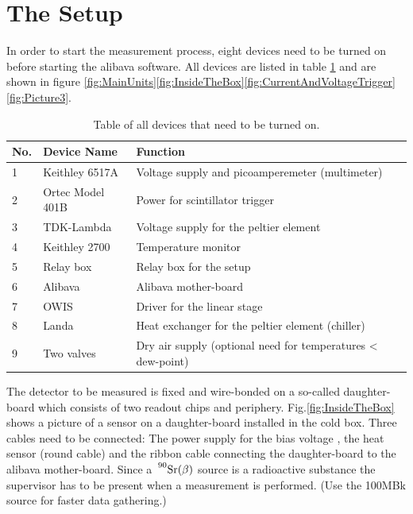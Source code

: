 \documentclass{article}
\begin{document}
\section{The Setup}
In order to start the measurement process, eight devices need to be turned on before starting the alibava software. All devices are listed in table \ref{tab:devices} and are shown in figure \ref{fig:MainUnits}\ref{fig:InsideTheBox}\ref{fig:CurrentAndVoltageTrigger}\ref{fig:Picture3}.
\begin{table}[htb]
\begin{center}
    \begin{tabular}{|l|l|l|}
        \hline
    No. & Device Name        & Function    \\  \hline
        1 & Keithley 6517A        & Voltage supply and picoamperemeter (multimeter)         \\
        2 & Ortec Model 401B        & Power for scintillator trigger        \\
        3 & TDK-Lambda            & Voltage supply for the peltier element         \\
        4 & Keithley 2700        & Temperature monitor          \\
        5 & Relay box            & Relay box for the setup         \\
        6 & Alibava            & Alibava mother-board         \\
        7 & OWIS            & Driver for the linear stage         \\
        8 & Landa            & Heat exchanger for the peltier element (chiller)         \\
        9 & Two valves            & Dry air supply (optional need for temperatures < dew-point) \\
        \hline

    \end{tabular}
\caption{Table of all devices that need to be turned on.}
\end{center}
\label{tab:devices}
\end{table}
The detector to be measured is fixed and wire-bonded on a so-called daughter-board which consists of two readout chips and periphery. Fig.\ref{fig:InsideTheBox} shows a picture of a sensor on a daughter-board installed in the cold box. Three cables need to be connected: The power supply for the bias voltage , the heat sensor (round cable) and the ribbon cable connecting the daughter-board to the alibava mother-board.
Since a $\sideset{^{90}}{}{\mathop{\mathrm{Sr}(\beta)}}$ source is a radioactive substance the supervisor has to be present when a measurement is performed. (Use the 100MBk source for faster data gathering.)
\end{document}
